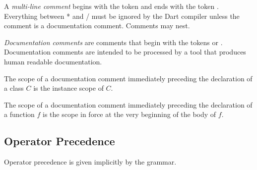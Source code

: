 \documentclass{article}
\begin{document}
\LMHash{}
A {\em multi-line comment} begins with the token \code{/*} and ends with the token \code{*/}.
Everything between \code{/}* and \code{*}/ must be ignored by the Dart compiler unless the comment is a documentation comment.
Comments may nest.

\LMHash{}
{\em Documentation comments} are comments that begin with the tokens \code{///} or \code{/**}.
Documentation comments are intended to be processed by a tool that produces human readable documentation.

\LMHash{}
The scope of a documentation comment immediately preceding the declaration of a class $C$ is the instance scope of $C$.

\LMHash{}
The scope of a documentation comment immediately preceding the declaration of a function $f$ is the scope in force at the very beginning of the body of $f$.


\subsection{Operator Precedence}

\LMHash{}
Operator precedence is given implicitly by the grammar.

\end{document}
